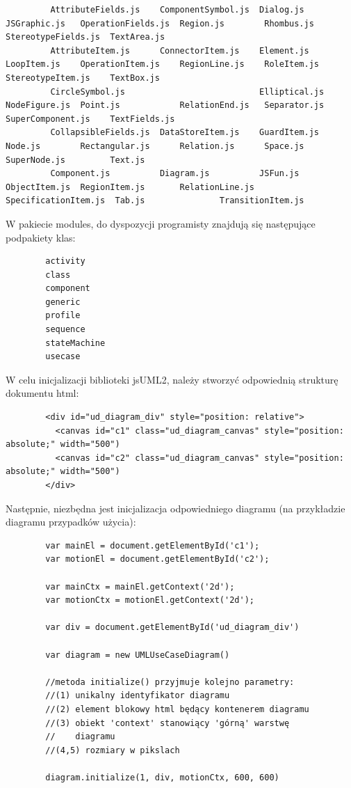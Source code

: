         \begin{verbatim}
         AttributeFields.js    ComponentSymbol.js  Dialog.js      JSGraphic.js   OperationFields.js  Region.js        Rhombus.js            StereotypeFields.js  TextArea.js
         AttributeItem.js      ConnectorItem.js    Element.js     LoopItem.js    OperationItem.js    RegionLine.js    RoleItem.js           StereotypeItem.js    TextBox.js
         CircleSymbol.js                           Elliptical.js  NodeFigure.js  Point.js            RelationEnd.js   Separator.js          SuperComponent.js    TextFields.js
         CollapsibleFields.js  DataStoreItem.js    GuardItem.js   Node.js        Rectangular.js      Relation.js      Space.js              SuperNode.js         Text.js
         Component.js          Diagram.js          JSFun.js       ObjectItem.js  RegionItem.js       RelationLine.js  SpecificationItem.js  Tab.js               TransitionItem.js
        \end{verbatim}

        W pakiecie modules, do dyspozycji programisty znajdują się następujące podpakiety klas:

        \begin{verbatim}
        activity
        class
        component
        generic
        profile
        sequence
        stateMachine
        usecase
        \end{verbatim}

        W celu inicjalizacji biblioteki jsUML2, należy stworzyć odpowiednią strukturę dokumentu html:

        \begin{verbatim}
        <div id="ud_diagram_div" style="position: relative">
          <canvas id="c1" class="ud_diagram_canvas" style="position: absolute;" width="500")
          <canvas id="c2" class="ud_diagram_canvas" style="position: absolute;" width="500")
        </div>
        \end{verbatim}
      
        Następnie, niezbędna jest inicjalizacja odpowiedniego diagramu (na przykładzie diagramu przypadków użycia):

        \begin{verbatim}
        var mainEl = document.getElementById('c1');
        var motionEl = document.getElementById('c2');

        var mainCtx = mainEl.getContext('2d');
        var motionCtx = motionEl.getContext('2d');

        var div = document.getElementById('ud_diagram_div')

        var diagram = new UMLUseCaseDiagram()

        //metoda initialize() przyjmuje kolejno parametry:
        //(1) unikalny identyfikator diagramu
        //(2) element blokowy html będący kontenerem diagramu
        //(3) obiekt 'context' stanowiący 'górną' warstwę
        //    diagramu
        //(4,5) rozmiary w pikslach 

        diagram.initialize(1, div, motionCtx, 600, 600) 
        \end{verbatim}

